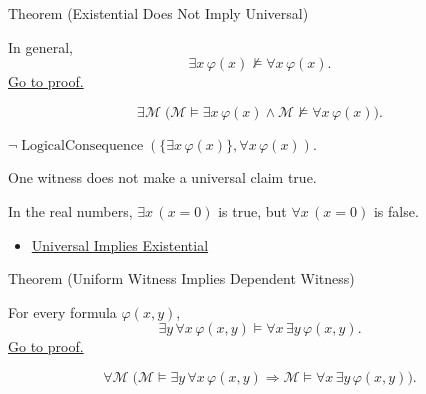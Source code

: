 \begin{theorembox}{Theorem (Existential Does Not Imply Universal)}
\begin{theorem}
\label{thm:existential-not-universal}
In general,
\[
\exists x\,\varphi(x)\not\models \forall x\,\varphi(x).
\]
\hyperref[prf:existential-not-universal]{Go to proof.}
\end{theorem}
\end{theorembox}

\begin{remark*}
\[
\exists \mathcal M\;
\bigl(\mathcal M\models\exists x\,\varphi(x)
\land
\mathcal M\not\models\forall x\,\varphi(x)\bigr).
\]
\end{remark*}

\begin{remark*}
\(\neg\operatorname{LogicalConsequence}(\{\exists x\,\varphi(x)\},\forall x\,\varphi(x))\).
\end{remark*}

\begin{remark*}[Interpretation]
One witness does not make a universal claim true.
\end{remark*}

\begin{remark*}[Exposition]
In the real numbers, \(\exists x\,(x=0)\) is true, but
\(\forall x\,(x=0)\) is false.
\end{remark*}

\begin{dependencies}
\begin{itemize}
  \item \hyperref[thm:universal-implies-existential]{Universal Implies Existential}
\end{itemize}
\end{dependencies}

\begin{theorembox}{Theorem (Uniform Witness Implies Dependent Witness)}
\begin{theorem}
\label{thm:uniform-witness-implies-dependent-witness}
For every formula \(\varphi(x,y)\),
\[
\exists y\,\forall x\,\varphi(x,y)
\models
\forall x\,\exists y\,\varphi(x,y).
\]
\hyperref[prf:uniform-witness-implies-dependent-witness]{Go to proof.}
\end{theorem}
\end{theorembox}

\begin{remark*}
\[
\forall \mathcal M\;
\bigl(
\mathcal M\models\exists y\,\forall x\,\varphi(x,y)
\Rightarrow
\mathcal M\models\forall x\,\exists y\,\varphi(x,y)
\bigr).
\]
\end{remark*}

